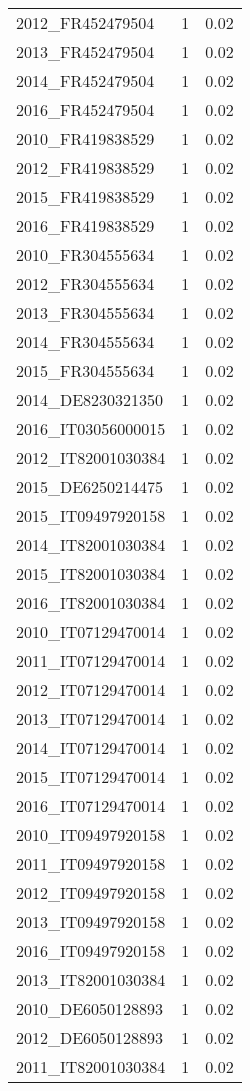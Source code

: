 \begin{table*}[htbp]
\begin{tabular}{lrr}
2012_FR452479504 & 1 & 0.02 \\
2013_FR452479504 & 1 & 0.02 \\
2014_FR452479504 & 1 & 0.02 \\
2016_FR452479504 & 1 & 0.02 \\
2010_FR419838529 & 1 & 0.02 \\
2012_FR419838529 & 1 & 0.02 \\
2015_FR419838529 & 1 & 0.02 \\
2016_FR419838529 & 1 & 0.02 \\
2010_FR304555634 & 1 & 0.02 \\
2012_FR304555634 & 1 & 0.02 \\
2013_FR304555634 & 1 & 0.02 \\
2014_FR304555634 & 1 & 0.02 \\
2015_FR304555634 & 1 & 0.02 \\
2014_DE8230321350 & 1 & 0.02 \\
2016_IT03056000015 & 1 & 0.02 \\
2012_IT82001030384 & 1 & 0.02 \\
2015_DE6250214475 & 1 & 0.02 \\
2015_IT09497920158 & 1 & 0.02 \\
2014_IT82001030384 & 1 & 0.02 \\
2015_IT82001030384 & 1 & 0.02 \\
2016_IT82001030384 & 1 & 0.02 \\
2010_IT07129470014 & 1 & 0.02 \\
2011_IT07129470014 & 1 & 0.02 \\
2012_IT07129470014 & 1 & 0.02 \\
2013_IT07129470014 & 1 & 0.02 \\
2014_IT07129470014 & 1 & 0.02 \\
2015_IT07129470014 & 1 & 0.02 \\
2016_IT07129470014 & 1 & 0.02 \\
2010_IT09497920158 & 1 & 0.02 \\
2011_IT09497920158 & 1 & 0.02 \\
2012_IT09497920158 & 1 & 0.02 \\
2013_IT09497920158 & 1 & 0.02 \\
2016_IT09497920158 & 1 & 0.02 \\
2013_IT82001030384 & 1 & 0.02 \\
2010_DE6050128893 & 1 & 0.02 \\
2012_DE6050128893 & 1 & 0.02 \\
2011_IT82001030384 & 1 & 0.02 \\

\end{tabular}
\end{table*}
